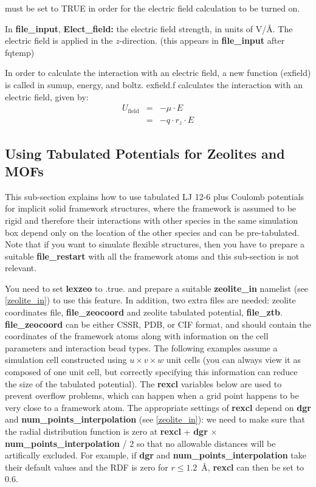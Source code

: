 \documentclass[12pt,letterpaper]{article}
\begin{document}
 must be set to TRUE in order for the
electric field calculation to be turned on.

\noindent In {\bf file\_input}, {\bf Elect\_field:} the
electric field strength, in units of V/\AA. The electric
field is applied in the $z$-direction. (this appears in
{\bf file\_input} after fqtemp)

In order to calculate the interaction with an electric
field, a new function (exfield) is called in sumup, energy,
and boltz. exfield.f calculates the interaction with an
electric field, given by:
\begin{eqnarray}
U_{\textrm{field}} & = & -\mu \cdot E \\
& = & -q \cdot r_z \cdot E
\end{eqnarray}

\subsection{Using Tabulated Potentials for Zeolites and MOFs}
\label{zeolite}
This sub-section explains how to use tabulated LJ 12-6 plus
Coulomb potentials for implicit solid framework structures,
where the framework is assumed to be rigid and therefore
their interactions with other species in the same simulation
box depend only on the location of the other species and can
be pre-tabulated. Note that if you want to simulate flexible
structures, then you have to prepare a suitable
\textbf{file\_restart} with all the framework atoms and this
sub-section is not relevant.

You need to set \textbf{lexzeo} to .true. and prepare a
suitable \textbf{zeolite\_in} namelist (see
\ref{zeolite_in}) to use this feature. In addition, two
extra files are needed: zeolite coordinates file,
\textbf{file\_zeocoord} and zeolite tabulated potential,
\textbf{file\_ztb}. \textbf{file\_zeocoord} can be either
CSSR, PDB, or CIF format, and should contain the coordinates
of the framework atoms along with information on the cell
parameters and interaction bead types. The following
examples assume a simulation cell constructed using $u\times
v\times w$ unit cells (you can always view it as composed of
one unit cell, but correctly specifying this information can
reduce the size of the tabulated potential). The
\textbf{rexcl} variables below are used to prevent overflow
problems, which can happen when a grid point happens to be
very close to a framework atom. The appropriate settings of
\textbf{rexcl} depend on \textbf{dgr} and
\textbf{num\_points\_interpolation} (see \ref{zeolite_in}):
we need to make sure that the radial distribution function
is zero at \textbf{rexcl} + \textbf{dgr} $\times$
\textbf{num\_points\_interpolation} / 2 so that no allowable
distances will be artifically excluded. For example, if
\textbf{dgr} and \textbf{num\_points\_interpolation} take
their default values and the RDF is zero for $r \leq
1.2$~\AA, \textbf{rexcl} can then be set to 0.6.
\end{document}
